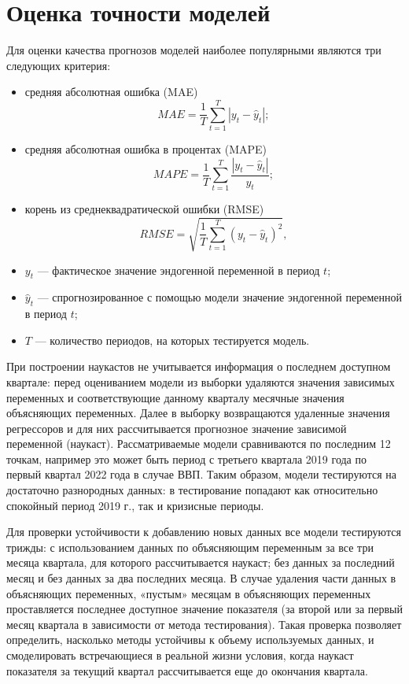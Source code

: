 \documentclass[a4paper, 14pt]{extreport}
\numberwithin{equation}{subsection}
\numberwithin{equation}{section}
\begin{document}
	\section{Оценка точности моделей}\label{sec:methods}
	Для оценки качества прогнозов моделей наиболее популярными являются три следующих критерия: 
	\begin{itemize}
		\item средняя абсолютная ошибка (MAE) 
		\begin{equation}
			MAE = \dfrac{1}{T}\sum_{t=1}^{T}|y_t - \hat y _t|;
		\end{equation}
		\item средняя абсолютная ошибка в процентах (MAPE)
		\begin{equation}
			MAPE = \dfrac{1}{T}\sum_{t=1}^{T}\dfrac{|y_t - \hat y _t|}{y_t};
		\end{equation}
		\item корень из среднеквадратической ошибки (RMSE)
		\begin{equation}
			RMSE = \sqrt{\dfrac{1}{T}\sum_{t=1}^{T}(y_t - \hat y_t)^2},
		\end{equation}
	\end{itemize}
	\begin{itemize}
		\item $y_t$ --- фактическое значение эндогенной переменной в период $t$;
		\item $\hat y _t$ --- спрогнозированное с помощью модели значение эндогенной переменной в период $t$;
		\item $T$ --- количество периодов, на которых тестируется модель.
	\end{itemize}  	
	
	При построении наукастов не учитывается информация о последнем доступном квартале: перед оцениванием модели из выборки удаляются значения зависимых переменных и соответствующие данному кварталу месячные значения объясняющих переменных. Далее в выборку возвращаются удаленные значения регрессоров и для них рассчитывается прогнозное значение зависимой переменной (наукаст). Рассматриваемые модели сравниваются по последним 12 точкам, например это может быть период с третьего квартала 2019 года по первый квартал 2022 года в случае ВВП. Таким образом, модели тестируются на достаточно разнородных данных: в тестирование попадают как относительно спокойный период 2019 г., так и кризисные периоды.
	
	Для проверки устойчивости к добавлению новых данных все модели тестируются трижды: с использованием данных по объясняющим переменным за все три месяца квартала, для которого рассчитывается наукаст; без данных за последний месяц и без данных за два последних месяца. В случае удаления части данных в объясняющих переменных, «пустым» месяцам в объясняющих переменных проставляется последнее доступное значение показателя (за второй или за первый месяц квартала в зависимости от метода тестирования). Такая проверка позволяет определить, насколько методы устойчивы к объему используемых данных, и смоделировать встречающиеся в реальной жизни условия, когда наукаст показателя за текущий квартал рассчитывается еще до окончания квартала. 
	
\end{document}
